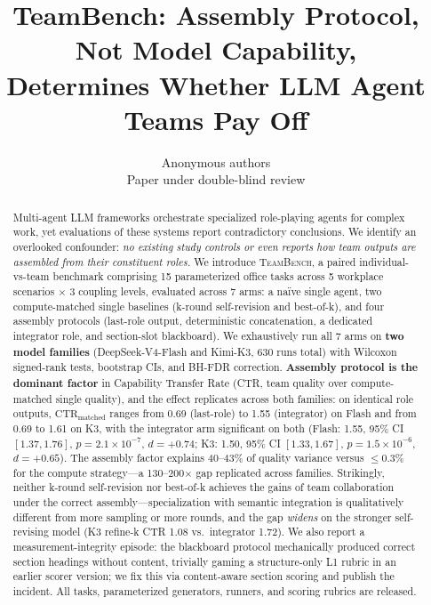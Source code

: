 \documentclass{article}
\title{TeamBench: Assembly Protocol, Not Model Capability,\\ Determines Whether LLM Agent Teams Pay Off}
\author{
  Anonymous authors\\
  Paper under double-blind review
}
\newcommand{\teambench}{\textsc{TeamBench}}
\newcommand{\ctrm}{\mathrm{CTR}_{\text{matched}}}
\begin{document}
\maketitle

\begin{abstract}
Multi-agent LLM frameworks orchestrate specialized role-playing agents for complex work, yet evaluations of these systems report contradictory conclusions. We identify an overlooked confounder: \emph{no existing study controls or even reports how team outputs are assembled from their constituent roles.} We introduce \teambench{}, a paired individual-vs-team benchmark comprising 15 parameterized office tasks across 5 workplace scenarios $\times$ 3 coupling levels, evaluated across 7 arms: a na\"ive single agent, two compute-matched single baselines (k-round self-revision and best-of-k), and four assembly protocols (last-role output, deterministic concatenation, a dedicated integrator role, and section-slot blackboard). We exhaustively run all 7 arms on \textbf{two model families} (DeepSeek-V4-Flash and Kimi-K3, 630 runs total) with Wilcoxon signed-rank tests, bootstrap CIs, and BH-FDR correction. \textbf{Assembly protocol is the dominant factor} in Capability Transfer Rate (CTR, team quality over compute-matched single quality), and the effect replicates across both families: on identical role outputs, $\ctrm$ ranges from 0.69 (last-role) to 1.55 (integrator) on Flash and from 0.69 to 1.61 on K3, with the integrator arm significant on both (Flash: 1.55, 95\% CI $[1.37, 1.76]$, $p = 2.1\times10^{-7}$, $d = +0.74$; K3: 1.50, 95\% CI $[1.33, 1.67]$, $p = 1.5\times10^{-6}$, $d = +0.65$). The assembly factor explains 40--43\% of quality variance versus $\le$0.3\% for the compute strategy---a 130--200$\times$ gap replicated across families. Strikingly, neither k-round self-revision nor best-of-k achieves the gains of team collaboration under the correct assembly---specialization with semantic integration is qualitatively different from more sampling or more rounds, and the gap \emph{widens} on the stronger self-revising model (K3 refine-k CTR 1.08 vs.\ integrator 1.72). We also report a measurement-integrity episode: the blackboard protocol mechanically produced correct section headings without content, trivially gaming a structure-only L1 rubric in an earlier scorer version; we fix this via content-aware section scoring and publish the incident. All tasks, parameterized generators, runners, and scoring rubrics are released.
\end{abstract}
\end{document}
